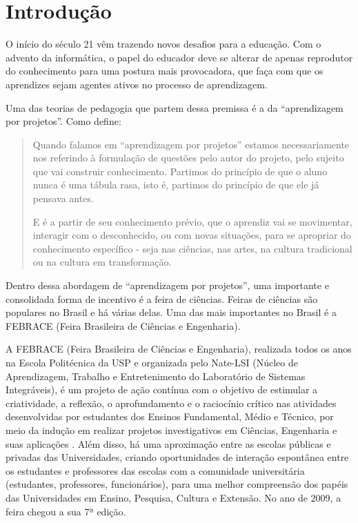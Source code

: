 
\chapter{Introdução}

O início do século 21 vêm trazendo novos desafios para a educação. Com o advento da informática, o papel do educador deve se alterar de apenas reprodutor do conhecimento para uma postura mais provocadora, que faça com que os aprendizes sejam agentes ativos no processo de aprendizagem. 

Uma das teorias de pedagogia que partem dessa premissa é a da “aprendizagem por projetos”. Como  define:

\begin{quotation}
    Quando falamos em “aprendizagem por projetos” estamos necessariamente nos referindo à formulação de questões pelo autor do projeto, pelo sujeito que vai construir conhecimento. Partimos do princípio de que o aluno nunca é uma tábula rasa, isto é, partimos do princípio de que ele já pensava antes.

    E é a partir de seu conhecimento prévio, que o aprendiz vai se movimentar, interagir com o desconhecido, ou com novas situações, para se apropriar do conhecimento específico - seja nas ciências, nas artes, na cultura tradicional ou na cultura em transformação.
\end{quotation}

Dentro dessa abordagem de “aprendizagem por projetos”, uma importante e consolidada forma de incentivo é a feira de ciências. Feiras de ciências são populares no Brasil e há várias delas. Uma das mais importantes no Brasil é a FEBRACE (Feira Brasileira de Ciências e Engenharia).

A FEBRACE (Feira Brasileira de Ciências e Engenharia), realizada todos os anos na Escola Politécnica da USP e organizada pelo Nate-LSI (Núcleo de Aprendizagem, Trabalho e Entretenimento do Laboratório de Sistemas Integráveis), é um projeto de ação contínua com o objetivo de estimular a criatividade, a reflexão, o aprofundamento e o raciocínio crítico nas atividades desenvolvidas por estudantes dos Ensinos Fundamental, Médio e Técnico, por meio da indução em realizar projetos investigativos em Ciências, Engenharia e suas aplicações \cite{lopes07}. Além disso, há uma aproximação entre as escolas públicas e privadas das Universidades, criando oportunidades de interação espontânea entre os estudantes e professores das escolas com a comunidade universitária (estudantes, professores, funcionários), para uma melhor compreensão dos papéis das Universidades em Ensino, Pesquisa, Cultura e Extensão. No ano de 2009, a feira chegou a sua 7ª edição.

